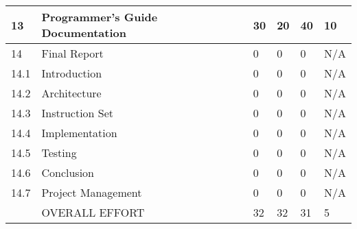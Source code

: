 \begin{table}[!h]
\begin{tabular}{p{0.8cm}p{\textwidth-10.2cm}p{1.7cm}p{1.7cm}p{1.7cm}p{1.7cm}}
13   & Programmer's Guide Documentation			& 30	& 20	& 40 	& 10 \\ \hline 
14    & Final Report					& 0	& 0	& 0 	& N/A \\  
14.1  & Introduction 					& 0	& 0	& 0 	& N/A \\  
14.2  & Architecture 					& 0	& 0	& 0 	& N/A \\  
14.3  & Instruction Set 				& 0	& 0	& 0 	& N/A \\  
14.4  & Implementation 					& 0	& 0	& 0 	& N/A \\  
14.5  & Testing 					& 0	& 0	& 0 	& N/A \\  
14.6  & Conclusion 					& 0	& 0	& 0 	& N/A \\  
14.7  & Project Management 				& 0	& 0	& 0 	& N/A \\ \hline 
      &  OVERALL EFFORT					& 32	& 32	& 31 	& 5 \\ \hline 
\end{tabular}
\end{table}

